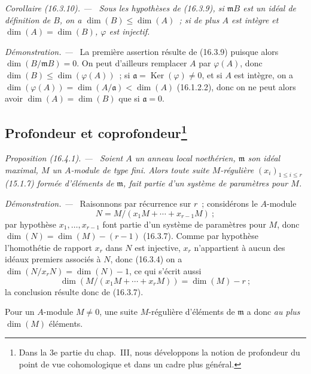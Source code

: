 \documentclass[10pt,oneside]{book}
\makeatletter
\newcommand{\setmanualcurrentlabel}[1]{\def\@currentlabel{#1}}
\newenvironment{proposition}[1][]{%
  \setmanualcurrentlabel{#1}\par\medskip\noindent\itshape Proposition (#1). ---\ }{\par}
\newenvironment{corollary}[1][]{%
  \setmanualcurrentlabel{#1}\par\medskip\noindent\itshape Corollaire (#1). ---\ }{\par}
\newenvironment{proof}{%
  \par\medskip\noindent\textit{Démonstration. ---\ }}{\par}
\makeatother
\begin{document}
\begin{corollary}[16.3.10]
\label{0.16.3.10-fr}
Sous les hypothèses de (16.3.9), si $\mathfrak{m}B$ est un idéal de définition
de $B$, on a $\dim(B)\leq\dim(A)$~; si de plus $A$ est intègre et
$\dim(A)=\dim(B)$, $\varphi$ est injectif.
\end{corollary}

\begin{proof}
La première assertion résulte de (16.3.9) puisque alors
$\dim(B/\mathfrak{m}B)=0$. On peut d'ailleurs remplacer $A$ par
$\varphi(A)$, donc $\dim(B)\leq\dim(\varphi(A))$~; si
$\mathfrak{a}=\operatorname{Ker}(\varphi)\neq0$, et si $A$ est intègre, on a
$\dim(\varphi(A))=\dim(A/\mathfrak{a})<\dim(A)$ (16.1.2.2), donc on ne peut
alors avoir $\dim(A)=\dim(B)$ que si $\mathfrak{a}=0$.
\end{proof}

\subsection[Profondeur et coprofondeur]{Profondeur et
coprofondeur\protect\footnote{Dans la 3e partie du chap.~III, nous développons
la notion de profondeur du point de vue cohomologique et dans un cadre plus
général.}}
\label{subsection:0.16.4-fr}

\begin{proposition}[16.4.1]
\label{0.16.4.1-fr}
Soient $A$ un anneau local noethérien, $\mathfrak{m}$ son idéal maximal, $M$ un
$A$-module de type fini. Alors toute suite $M$-régulière
$(x_i)_{1\leq i\leq r}$ (15.1.7) formée d'éléments de $\mathfrak{m}$, fait
partie d'un système de paramètres pour $M$.
\end{proposition}

\begin{proof}
Raisonnons par récurrence sur $r$~; considérons le $A$-module
\[
  N=M/(x_1M+\cdots+x_{r-1}M)~;
\]
par hypothèse $x_1,\ldots,x_{r-1}$ font partie d'un système de paramètres pour
$M$, donc $\dim(N)=\dim(M)-(r-1)$ (16.3.7). Comme par hypothèse l'homothétie
de rapport $x_r$ dans $N$ est injective, $x_r$ n'appartient à aucun des idéaux
premiers associés à $N$, donc (16.3.4) on a
$\dim(N/x_rN)=\dim(N)-1$, ce qui s'écrit aussi
\[
  \dim(M/(x_1M+\cdots+x_rM))=\dim(M)-r~;
\]
la conclusion résulte donc de (16.3.7).
\end{proof}

Pour un $A$-module $M\neq0$, une suite $M$-régulière d'éléments de
$\mathfrak{m}$ a donc \emph{au plus} $\dim(M)$ éléments.
\end{document}

